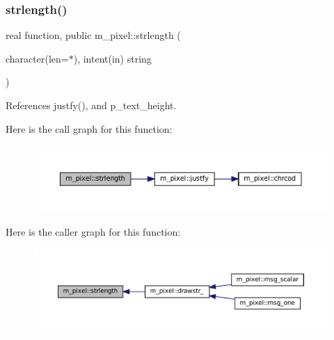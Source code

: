 \mbox{\label{namespacem__pixel_a0468f8d9308bade7f8f2a68a133271d2}} 
\subsubsection{\texorpdfstring{strlength()}{strlength()}}
{\footnotesize\ttfamily real function, public m\+\_\+pixel\+::strlength (\begin{DoxyParamCaption}\item[{character(len=$\ast$), intent(in)}]{string }\end{DoxyParamCaption})}



References justfy(), and p\+\_\+text\+\_\+height.

Here is the call graph for this function\+:
\nopagebreak
\begin{figure}[H]
\begin{center}
\leavevmode
\includegraphics[width=350pt]{namespacem__pixel_a0468f8d9308bade7f8f2a68a133271d2_cgraph}
\end{center}
\end{figure}
Here is the caller graph for this function\+:
\nopagebreak
\begin{figure}[H]
\begin{center}
\leavevmode
\includegraphics[width=350pt]{namespacem__pixel_a0468f8d9308bade7f8f2a68a133271d2_icgraph}
\end{center}
\end{figure}
\mbox{\label{namespacem__pixel_a063f74c3dd2f7f086dc47ec68abc22c9}} 
